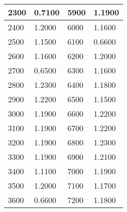 \documentclass{ctexart}
\begin{document}
\begin{table}[htbp]
\begin{tabular}{|l|l||l|l|}
		2300 & 0.7100 & 5900 & 1.1900 \\
		\hline
		2400 & 1.2000 & 6000 & 1.1600 \\
		\hline
		2500 & 1.1500 & 6100 & 0.6600 \\
		\hline
		2600 & 1.1600 & 6200 & 1.2000 \\
		\hline
		2700 & 0.6500 & 6300 & 1.1600 \\
		\hline
		2800 & 1.2300 & 6400 & 1.1800 \\
		\hline
		2900 & 1.2200 & 6500 & 1.1500 \\
		\hline
		3000 & 1.1900 & 6600 & 1.2200 \\
		\hline
		3100 & 1.1900 & 6700 & 1.2200 \\
		\hline
		3200 & 1.1900 & 6800 & 1.2300 \\
		\hline
		3300 & 1.1900 & 6900 & 1.2100 \\
		\hline
		3400 & 1.1100 & 7000 & 1.1900 \\
		\hline
		3500 & 1.2000 & 7100 & 1.1700 \\
		\hline
		3600 & 0.6600 & 7200 & 1.1800 \\
		\hline
		\end{tabular}
	\end{table}
	\newpage
\end{document}
